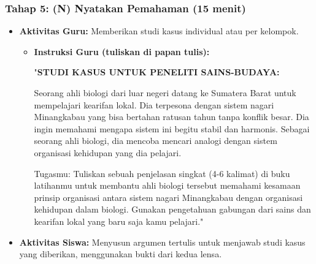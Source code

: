 \documentclass[a4paper,12pt]{article}
\begin{document}
\subsubsection{Tahap 5: (N) Nyatakan Pemahaman (15 menit)}
\begin{itemize}
\item \textbf{Aktivitas Guru:} Memberikan studi kasus individual atau per kelompok.
    \begin{itemize}
    \item \textbf{Instruksi Guru (tuliskan di papan tulis):}
    
    "\textbf{STUDI KASUS UNTUK PENELITI SAINS-BUDAYA:}
    
    Seorang ahli biologi dari luar negeri datang ke Sumatera Barat untuk mempelajari kearifan lokal. Dia terpesona dengan sistem nagari Minangkabau yang bisa bertahan ratusan tahun tanpa konflik besar. Dia ingin memahami mengapa sistem ini begitu stabil dan harmonis. Sebagai seorang ahli biologi, dia mencoba mencari analogi dengan sistem organisasi kehidupan yang dia pelajari.
    
    Tugasmu: Tuliskan sebuah penjelasan singkat (4-6 kalimat) di buku latihanmu untuk membantu ahli biologi tersebut memahami kesamaan prinsip organisasi antara sistem nagari Minangkabau dengan organisasi kehidupan dalam biologi. Gunakan pengetahuan gabungan dari sains dan kearifan lokal yang baru saja kamu pelajari."
    \end{itemize}
\item \textbf{Aktivitas Siswa:} Menyusun argumen tertulis untuk menjawab studi kasus yang diberikan, menggunakan bukti dari kedua lensa.
\end{itemize}
\end{document}
